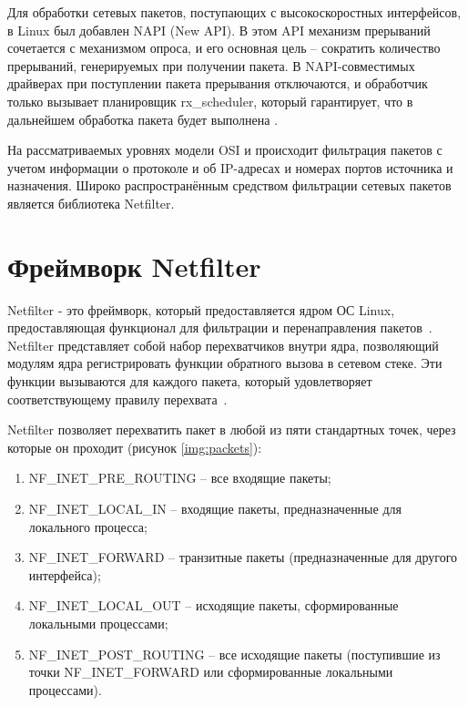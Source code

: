 \documentclass{bmstu}
\begin{document}
Для обработки сетевых пакетов, поступающих с высокоскоростных интерфейсов, в Linux был добавлен NAPI (New API). В этом API механизм прерываний сочетается с механизмом опроса, и его основная цель -- сократить количество прерываний, генерируемых при получении пакета. В NAPI-совместимых драйверах при поступлении пакета прерывания отключаются, и обработчик только вызывает планировщик rx\_scheduler, который гарантирует, что в дальнейшем обработка пакета будет выполнена \cite{b5}.

На рассматриваемых уровнях модели OSI и происходит фильтрация пакетов с учетом информации о протоколе и об IP-адресах и номерах портов источника и назначения. Широко распространённым средством фильтрации сетевых пакетов является библиотека Netfilter.

\section{Фреймворк Netfilter}

Netfilter - это фреймворк, который предоставляется ядром ОС Linux, предоставляющая функционал для фильтрации и перенаправления пакетов~\cite{b7}. Netfilter представляет собой набор перехватчиков внутри ядра, позволяющий модулям ядра регистрировать функции обратного вызова в сетевом стеке. Эти функции вызываются для каждого пакета, который удовлетворяет соответствующему правилу перехвата~\cite{netfilter}.


Netfilter позволяет перехватить пакет в любой из пяти стандартных точек, через которые он проходит (рисунок \ref{img:packets}):


\begin{enumerate}
	\item NF\_INET\_PRE\_ROUTING -- все входящие пакеты;
	\item NF\_INET\_LOCAL\_IN -- входящие пакеты, предназначенные для локального процесса;
	\item NF\_INET\_FORWARD -- транзитные пакеты (предназначенные для другого интерфейса);
	\item NF\_INET\_LOCAL\_OUT -- исходящие пакеты, сформированные локальными процессами;
	\item NF\_INET\_POST\_ROUTING -- все исходящие пакеты (поступившие из точки NF\_INET\_FORWARD или сформированные локальными процессами).
\end{enumerate}
\end{document}
